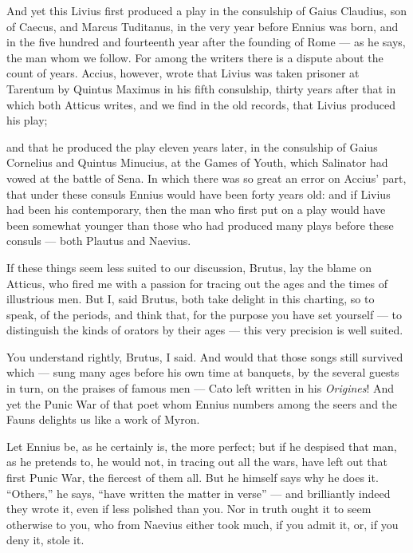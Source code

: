  And yet this Livius first produced a play in the consulship of Gaius Claudius, son of Caecus, and Marcus Tuditanus, in the very year before Ennius was born, and in the five hundred and fourteenth year after the founding of Rome — as he says, the man whom we follow. For among the writers there is a dispute about the count of years. Accius, however, wrote that Livius was taken prisoner at Tarentum by Quintus Maximus in his fifth consulship, thirty years after that in which both Atticus writes, and we find in the old records, that Livius produced his play;

 and that he produced the play eleven years later, in the consulship of Gaius Cornelius and Quintus Minucius, at the Games of Youth, which Salinator had vowed at the battle of Sena. In which there was so great an error on Accius' part, that under these consuls Ennius would have been forty years old: and if Livius had been his contemporary, then the man who first put on a play would have been somewhat younger than those who had produced many plays before these consuls — both Plautus and Naevius.

 If these things seem less suited to our discussion, Brutus, lay the blame on Atticus, who fired me with a passion for tracing out the ages and the times of illustrious men. But I, said Brutus, both take delight in this charting, so to speak, of the periods, and think that, for the purpose you have set yourself — to distinguish the kinds of orators by their ages — this very precision is well suited.

 You understand rightly, Brutus, I said. And would that those songs still survived which — sung many ages before his own time at banquets, by the several guests in turn, on the praises of famous men — Cato left written in his \textit{Origines}! And yet the Punic War of that poet whom Ennius numbers among the seers and the Fauns delights us like a work of Myron.

 Let Ennius be, as he certainly is, the more perfect; but if he despised that man, as he pretends to, he would not, in tracing out all the wars, have left out that first Punic War, the fiercest of them all. But he himself says why he does it. ``Others,'' he says, ``have written the matter in verse'' — and brilliantly indeed they wrote it, even if less polished than you. Nor in truth ought it to seem otherwise to you, who from Naevius either took much, if you admit it, or, if you deny it, stole it.


